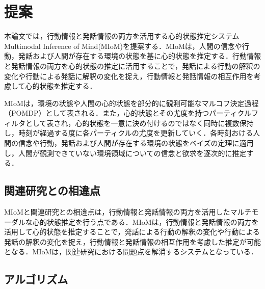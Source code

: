 \chapter{提案}
\par
本論文では，行動情報と発話情報の両方を活用する心的状態推定システムMultimodal Inference of Mind(MIoM)を提案する．MIoMは，人間の信念や行動，発話および人間が存在する環境の状態を基に心的状態を推定する．行動情報と発話情報の両方を心的状態の推定に活用することで，発話による行動の解釈の変化や行動による発話に解釈の変化を捉え，行動情報と発話情報の相互作用を考慮して心的状態を推定する．

\par
MIoMは，環境の状態や人間の心的状態を部分的に観測可能なマルコフ決定過程（POMDP）として表される．また，心的状態とその尤度を持つパーティクルフィルタとして表され，心的状態を一意に決め付けるのではなく同時に複数保持し，時刻が経過する度に各パーティクルの尤度を更新していく．各時刻おける人間の信念や行動，発話および人間が存在する環境の状態をベイズの定理に適用し，人間が観測できていない環境領域についての信念と欲求を逐次的に推定する．


\section{関連研究との相違点}
\par
MIoMと関連研究との相違点は，行動情報と発話情報の両方を活用したマルチモーダルな心的状態推定を行う点である．MIoMは，行動情報と発話情報の両方を活用して心的状態を推定することで，発話による行動の解釈の変化や行動による発話の解釈の変化を捉え，行動情報と発話情報の相互作用を考慮した推定が可能となる．MIoMは，関連研究における問題点を解消するシステムとなっている．


\section{アルゴリズム}

